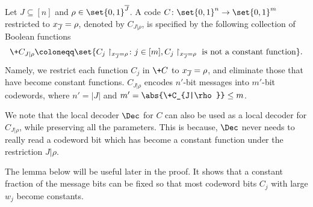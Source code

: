 Let $J \subseteq [n]$ and $\rho \in \set{0,1}^{\overline{J}}$. A code $C \colon \set{0,1}^n \rightarrow \set{0,1}^m$ restricted to $\*x_{\overline{J}} = \rho$, denoted by $C_{J|\rho}$, is specified by the following collection of Boolean functions
\begin{align*}
	\+C_{J|\rho} \coloneqq \set{C_j\restriction_{\*x_{\overline{J}}=\rho} \colon j \in [m], C_j\restriction_{\*x_{\overline{J}}=\rho}\textup{ is not a constant function}}.
\end{align*} 
Namely, we restrict each function $C_j$ in $\+C$ to $\*x_{\overline{J}}=\rho$, and eliminate those that have become constant functions. $C_{J|\rho}$ encodes $n'$-bit messages into $m'$-bit codewords, where $n'=|J|$ and $m' = \abs{\+C_{J|\rho}} \le m$. 

We note that the local decoder $\Dec$ for $C$ can also be used as a local decoder for $C_{J|\rho}$, while preserving all the parameters. This is because, $\Dec$ never needs to really read a codeword bit which has become a constant function under the restriction $J|\rho$. 

The lemma below will be useful later in the proof. It shows that a constant fraction of the message bits can be fixed so that most codeword bits $C_j$ with large $w_j$ become constants.

